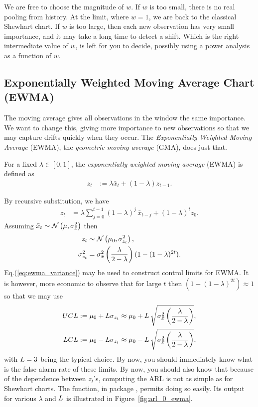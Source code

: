 We are free to choose the magnitude of $w$. 
If $w$ is too small, there is no real pooling from history. At the limit, where $w=1$, we are back to the classical Shewhart chart. 
If $w$ is too large, then each new observation has very small importance, and it may take a long time to detect a shift.
Which is the right intermediate value of $w$, is left for you to decide, possibly using a power analysis as a function of $w$. 






\subsection{Exponentially Weighted Moving Average Chart (EWMA)}
The moving average gives all observations in the window the same importance. 
We want to change this, giving more importance to new observations so that we may capture drifts quickly when they occur. 
The \emph{Exponentially Weighted Moving Average} (EWMA), \aka the \emph{geometric moving average} (GMA), does just that. 
\begin{definition}[EWMA]
For a fixed $\lambda \in [0,1]$, the \emph{exponentially weighted moving average} (EWMA) is defined as 
\begin{align}
	z_t &:= \lambda \bar{x}_t + (1-\lambda) z_{t-1}.
\end{align}
\end{definition}
By recursive substitution, we have 
\begin{align}
	z_t &= \lambda \sum_{j=0}^{t-1} (1-\lambda)^j \, \bar{x}_{t-j} + (1-\lambda)^t z_0.
\end{align}
Assuming $\bar{x}_{t} \sim \mathcal{N}\left(\mu, \sigma_{\bar{x}}^2\right)$ then  
\begin{align}
\label{eq:ewma_variance}
	z_t &\sim \mathcal{N}\left(\mu_0,	\sigma^2_{z_t} \right), \\
	\sigma^2_{z_t} &= \sigma_{\bar{x}}^2 \left( \frac{\lambda}{2-\lambda} \right)(1-(1-\lambda)^{2t}).
\end{align}
Eq.(\ref{eq:ewma_variance}) may be used to construct control limits for EWMA.
It is however, more economic to observe that for large $t$ then  $(1-(1-\lambda)^{2t}) \approx 1$ so that we may use 
\begin{align}
\begin{split}
\label{eq:ewma_variance_approximate}
	UCL &:= \mu_0 + L \sigma_{z_t} \approx \mu_0 + L \, \sqrt{\sigma_{\bar{x}}^2\left( \frac{\lambda}{2-\lambda} \right)},  \\
	LCL &:= \mu_0 - L \sigma_{z_t} \approx \mu_0 - L \, \sqrt{\sigma_{\bar{x}}^2\left( \frac{\lambda}{2-\lambda} \right)},
\end{split}
\end{align}
with $L=3$ being the typical choice.
By now, you should immediately know what is the false alarm rate of these limits.
By now, you should also know that because of the dependence between $z_t$'s, computing the ARL is not as simple as for Shewhart charts. The  \R function, in package , permits doing so easily. 
Its output for various $\lambda$ and $L$ is illustrated in Figure~\ref{fig:arl_0_ewma}.

